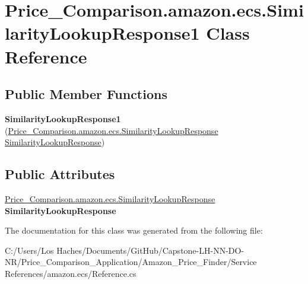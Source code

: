 \hypertarget{class_price___comparison_1_1amazon_1_1ecs_1_1_similarity_lookup_response1}{\section{Price\-\_\-\-Comparison.\-amazon.\-ecs.\-Similarity\-Lookup\-Response1 Class Reference}
\label{class_price___comparison_1_1amazon_1_1ecs_1_1_similarity_lookup_response1}
}
\subsection*{Public Member Functions}
\begin{DoxyCompactItemize}
\item 
\hypertarget{class_price___comparison_1_1amazon_1_1ecs_1_1_similarity_lookup_response1_a660eb211ed906414b1a38dc96d555e4a}{{\bfseries Similarity\-Lookup\-Response1} (\hyperlink{class_price___comparison_1_1amazon_1_1ecs_1_1_similarity_lookup_response}{Price\-\_\-\-Comparison.\-amazon.\-ecs.\-Similarity\-Lookup\-Response} \hyperlink{class_price___comparison_1_1amazon_1_1ecs_1_1_similarity_lookup_response}{Similarity\-Lookup\-Response})}\label{class_price___comparison_1_1amazon_1_1ecs_1_1_similarity_lookup_response1_a660eb211ed906414b1a38dc96d555e4a}

\end{DoxyCompactItemize}
\subsection*{Public Attributes}
\begin{DoxyCompactItemize}
\item 
\hypertarget{class_price___comparison_1_1amazon_1_1ecs_1_1_similarity_lookup_response1_aa31355889f8e4e868446c9cb19977069}{\hyperlink{class_price___comparison_1_1amazon_1_1ecs_1_1_similarity_lookup_response}{Price\-\_\-\-Comparison.\-amazon.\-ecs.\-Similarity\-Lookup\-Response} {\bfseries Similarity\-Lookup\-Response}}\label{class_price___comparison_1_1amazon_1_1ecs_1_1_similarity_lookup_response1_aa31355889f8e4e868446c9cb19977069}

\end{DoxyCompactItemize}


The documentation for this class was generated from the following file\-:\begin{DoxyCompactItemize}
\item 
C\-:/\-Users/\-Los Haches/\-Documents/\-Git\-Hub/\-Capstone-\/\-L\-H-\/\-N\-N-\/\-D\-O-\/\-N\-R/\-Price\-\_\-\-Comparison\-\_\-\-Application/\-Amazon\-\_\-\-Price\-\_\-\-Finder/\-Service References/amazon.\-ecs/Reference.\-cs\end{DoxyCompactItemize}
